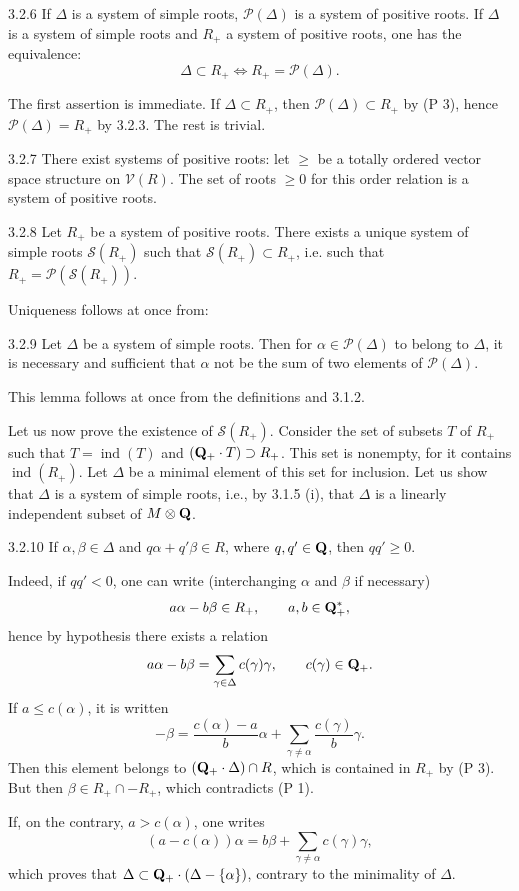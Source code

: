 \begin{proposition}{3.2.6}\label{XXI.3.2.6}
If $\Delta$ is a system of simple roots, $\mathcal P(\Delta)$ is a system of positive roots. If $\Delta$ is a system of simple roots and $R_+$ a system of positive roots, one has the equivalence:
\[
\Delta\subset R_+\Longleftrightarrow R_+=\mathcal P(\Delta).
\]
\end{proposition}
The first assertion is immediate. If $\Delta\subset R_+$, then $\mathcal P(\Delta)\subset R_+$ by (P 3), hence $\mathcal P(\Delta)=R_+$ by 3.2.3. The rest is trivial.
\begin{remark}{3.2.7}\label{XXI.3.2.7}
There exist systems of positive roots: let $\geq$ be a totally ordered vector space structure on $\mathcal V(R)$. The set of roots $\geq0$ for this order relation is a system of positive roots.
\end{remark}

\begin{theorem}{3.2.8}\label{XXI.3.2.8}
Let $R_+$ be a system of positive roots. There exists a unique system of simple roots $\mathcal S(R_+)$ such that $\mathcal S(R_+)\subset R_+$, i.e. such that $R_+=\mathcal P(\mathcal S(R_+))$.
\end{theorem}
Uniqueness follows at once from:
\begin{lemma}{3.2.9}\label{XXI.3.2.9}
Let $\Delta$ be a system of simple roots. Then for $\alpha\in\mathcal P(\Delta)$ to belong to $\Delta$, it is necessary and sufficient that $\alpha$ not be the sum of two elements of $\mathcal P(\Delta)$.
\end{lemma}
This lemma follows at once from the definitions and 3.1.2.

Let us now prove the existence of $\mathcal S(R_+)$. Consider the set of subsets $T$ of $R_+$ such that $T=\operatorname{ind}(T)$ and $(\mathbf{Q}_+\cdot T)\supset R_+$. This set is nonempty, for it contains $\operatorname{ind}(R_+)$. Let $\Delta$ be a minimal element of this set for inclusion. Let us show that $\Delta$ is a system of simple roots, i.e., by 3.1.5 (i), that $\Delta$ is a linearly independent subset of $M\otimes\mathbf{Q}$.
\begin{lemma}{3.2.10}\label{XXI.3.2.10}
If $\alpha,\beta\in\Delta$ and $q\alpha+q'\beta\in R$, where $q,q'\in\mathbf{Q}$, then $qq'\geq0$.
\end{lemma}
Indeed, if $qq'<0$, one can write (interchanging $\alpha$ and $\beta$ if necessary)
\[
a\alpha-b\beta\in R_+,\qquad a,b\in\mathbf{Q}_+^*,
\]
hence by hypothesis there exists a relation
\[
a\alpha-b\beta=\sum_{\gamma\in\Delta}c(\gamma)\gamma,\qquad c(\gamma)\in\mathbf{Q}_+.
\]
If $a\leq c(\alpha)$, it is written
\[
-\beta=\frac{c(\alpha)-a}b\alpha+\sum_{\gamma\ne\alpha}\frac{c(\gamma)}b\gamma.
\]
Then this element belongs to $(\mathbf{Q}_+\cdot\Delta)\cap R$, which is contained in $R_+$ by (P 3). But then $\beta\in R_+\cap-R_+$, which contradicts (P 1).

If, on the contrary, $a>c(\alpha)$, one writes
\[
(a-c(\alpha))\alpha=b\beta+\sum_{\gamma\ne\alpha}c(\gamma)\gamma,
\]
which proves that $\Delta\subset\mathbf{Q}_+\cdot(\Delta-\{\alpha\})$, contrary to the minimality of $\Delta$.

